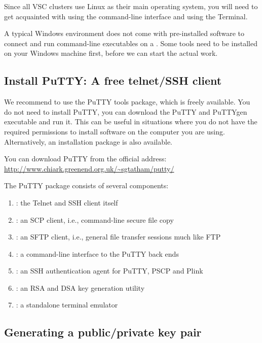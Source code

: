 Since all VSC clusters use Linux as their main operating system, you will
need to get acquainted with using the command-line interface and using the
Terminal.

\ifwindows
  A typical Windows environment does not come with pre-installed
  software to connect and run command-line executables on a \hpc. Some tools
  need to be installed on your Windows machine first, before we can start the
  actual work.

  \subsection{Install PuTTY: A free telnet/SSH client}
  \label{sec:install-putty}

  We recommend to use the PuTTY tools package, which is freely available. You
  do not need to install PuTTY, you can download the PuTTY and PuTTYgen executable
  and run it. This can be useful in situations where you do not have the
  required permissions to install software on the computer you are using.
  Alternatively, an installation package is also available.

  You can download PuTTY from the official address:
  \url{http://www.chiark.greenend.org.uk/\~sgtatham/putty/}

  The PuTTY package consists of several components:

  \begin{enumerate}
    \item  {}: the Telnet and SSH client itself
    \item  {}: an SCP client, i.e., command-line secure file copy
    \item  {}: an SFTP client, i.e., general file transfer sessions much like FTP
    \item  {}: a command-line interface to the PuTTY back ends
    \item  {}: an SSH authentication agent for PuTTY, PSCP and Plink
    \item  {}: an RSA and DSA key generation utility
    \item  {}: a standalone terminal emulator
  \end{enumerate}

  \subsection{Generating a public/private key pair}
  \label{sec:generate-key-pair}

